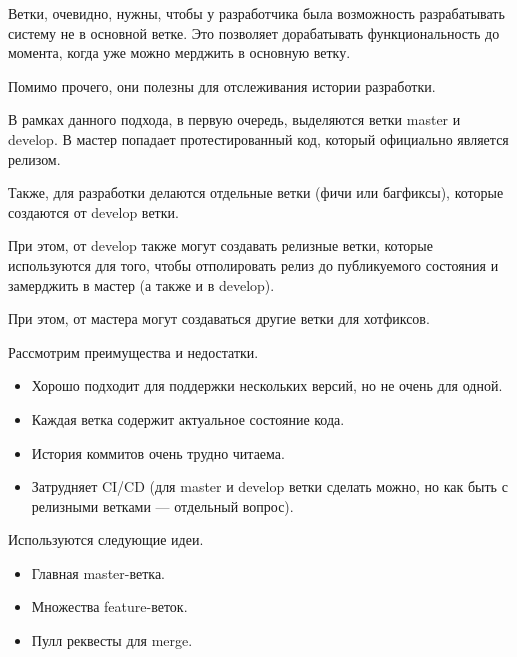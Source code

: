     \begin{Rem}[Gitflow]
        Ветки, очевидно, нужны, чтобы у разработчика была возможность разрабатывать систему не в основной ветке. Это позволяет дорабатывать функциональность до момента, когда уже можно мерджить в основную ветку.

        Помимо прочего, они полезны для отслеживания истории разработки.

        В рамках данного подхода, в первую очередь, выделяются ветки master и develop. В мастер попадает протестированный код, который официально является релизом. 

        Также, для разработки делаются отдельные ветки (фичи или багфиксы), которые создаются от develop ветки.

        При этом, от develop также могут создавать релизные ветки, которые используются для того, чтобы отполировать релиз до публикуемого состояния и замерджить в мастер (а также и в develop).

        При этом, от мастера могут создаваться другие ветки для хотфиксов.
    \end{Rem}
    
    \begin{Rem}
        Рассмотрим преимущества и недостатки.
        \begin{itemize}
            \item Хорошо подходит для поддержки нескольких версий, но не очень для одной.
            \item Каждая ветка содержит актуальное состояние кода.
            \item История коммитов очень трудно читаема.
            \item Затрудняет CI/CD (для master и develop ветки сделать можно, но как быть с релизными ветками --- отдельный вопрос).
        \end{itemize}
    \end{Rem}


    \begin{Rem}
        Используются следующие идеи.
        \begin{itemize}
            \item Главная master-ветка.
            \item Множества feature-веток.
            \item Пулл реквесты для merge.
        \end{itemize}
    \end{Rem}

